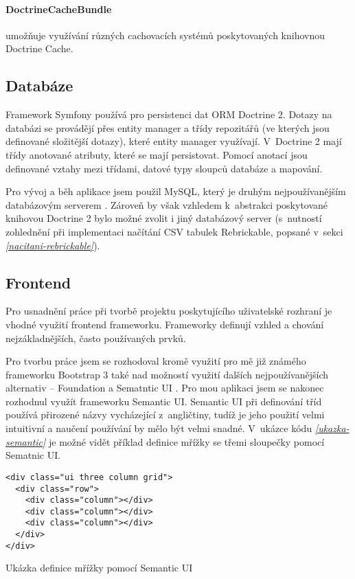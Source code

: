     \paragraph{DoctrineCacheBundle} 
    umožňuje využívání různých cachovacích systémů poskytovaných knihovnou Doctrine Cache. \autocite{doctrinecache}

\subsection{Databáze}
Framework Symfony používá pro persistenci dat \gls{ORM} Doctrine 2. Dotazy na databázi se provádějí přes entity manager a třídy
repozitářů (ve kterých jsou definované složitější dotazy), které entity manager využívají. V~Doctrine 2 mají třídy anotované atributy, které se mají persistovat. Pomocí anotací jsou definované vztahy mezi třídami, datové typy sloupců databáze a mapování.

Pro vývoj a běh aplikace jsem použil MySQL, který je druhým nejpoužívanějším databázovým serverem \autocite{database-servers}. Zároveň by však vzhledem k~abstrakci poskytované knihovou Doctrine 2 bylo možné zvolit i jiný databázový server (s~nutností zohlednění při implementaci načítání CSV tabulek Rebrickable, popsané v~sekci \emph{\ref{nacitani-rebrickable}}).

\subsection{Frontend}
Pro usnadnění práce při tvorbě projektu poskytujícího uživatelské rozhraní je vhodné využití frontend frameworku. Frameworky definují vzhled a chování nejzákladnějších, často používaných prvků. 

Pro tvorbu práce jsem se rozhodoval kromě využití pro mě již známého frameworku Bootstrap 3 také nad možností využití dalších nejpoužívanějších alternativ – Foundation a Sematntic UI \autocite{web:frameworks}. Pro mou aplikaci jsem se nakonec rozhodnul využít frameworku Semantic UI. Semantic UI při definování tříd používá přirozené názvy vycházející z~angličtiny, tudíž je jeho použití velmi intuitivní a naučení používání by mělo být velmi snadné. V~ukázce kódu \emph{\ref{ukazka-semantic}} je možné vidět příklad definice mřížky se třemi sloupečky pomocí Sematnic UI.

\begin{listing}[htbp]
  \begin{verbatim}
<div class="ui three column grid">
  <div class="row">
    <div class="column"></div>
    <div class="column"></div>
    <div class="column"></div>
  </div>
</div>
    \end{verbatim}
  \caption{Ukázka definice mřížky pomocí Semantic UI\label{ukazka-semantic}}
\end{listing}